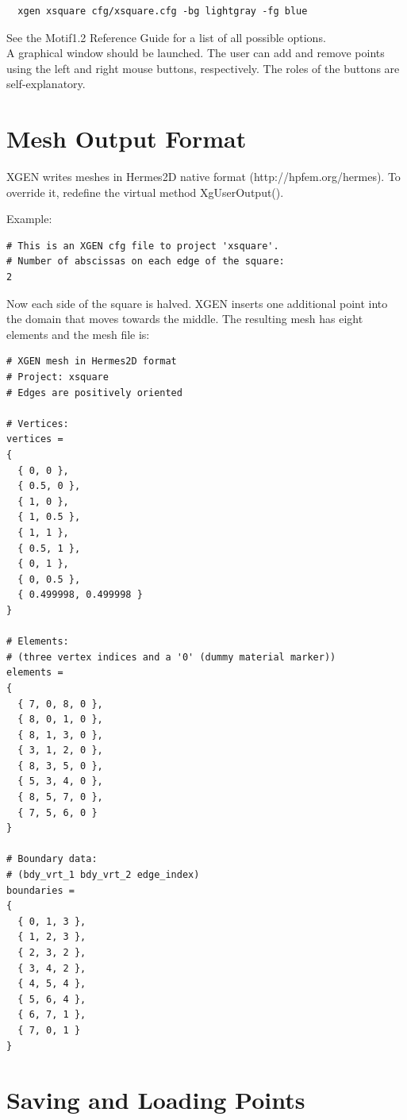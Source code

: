 \documentclass[12pt]{article}
\begin{document}
  \begin{verbatim}  
  xgen xsquare cfg/xsquare.cfg -bg lightgray -fg blue 
  \end{verbatim}
  See the Motif1.2 Reference Guide for a list of all possible options.\\

  \noindent
  A graphical window should be launched. The user can add and remove points using 
  the left and right mouse buttons, respectively. The roles of 
  the buttons are self-explanatory. 

  \section{Mesh Output Format} \label{out_form}

  XGEN writes meshes in Hermes2D native format (http://hpfem.org/hermes).
  To override it, redefine the virtual method XgUserOutput().

  \newpage
  \noindent
  Example: 

  \begin{verbatim}
# This is an XGEN cfg file to project 'xsquare'.
# Number of abscissas on each edge of the square:
2  
  \end{verbatim}
  Now each side of the square is halved. XGEN inserts one additional point into the domain 
  that moves towards the middle. The resulting mesh has eight elements and the mesh
  file is:
  \begin{verbatim}
# XGEN mesh in Hermes2D format
# Project: xsquare
# Edges are positively oriented

# Vertices:
vertices = 
{
  { 0, 0 },
  { 0.5, 0 },
  { 1, 0 },
  { 1, 0.5 },
  { 1, 1 },
  { 0.5, 1 },
  { 0, 1 },
  { 0, 0.5 },
  { 0.499998, 0.499998 }
}

# Elements:
# (three vertex indices and a '0' (dummy material marker))
elements =
{
  { 7, 0, 8, 0 },
  { 8, 0, 1, 0 },
  { 8, 1, 3, 0 },
  { 3, 1, 2, 0 },
  { 8, 3, 5, 0 },
  { 5, 3, 4, 0 },
  { 8, 5, 7, 0 },
  { 7, 5, 6, 0 }
}

# Boundary data:
# (bdy_vrt_1 bdy_vrt_2 edge_index)
boundaries =
{
  { 0, 1, 3 },
  { 1, 2, 3 },
  { 2, 3, 2 },
  { 3, 4, 2 },
  { 4, 5, 4 },
  { 5, 6, 4 },
  { 6, 7, 1 },
  { 7, 0, 1 }
}
  \end{verbatim}

  \section{Saving and Loading Points}
\end{document}
